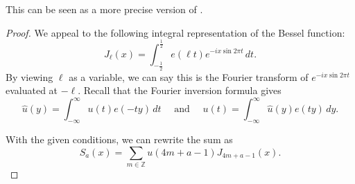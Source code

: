 \documentclass[reqno, 12pt]{amsart}
\renewcommand{\leq}{\leqslant}
\begin{document}
This can be seen as a more precise version of \cite[Corollary 8.2]{iwaniec_low_2000}.

\begin{proof}
We appeal to the following integral representation of the Bessel function: 
\begin{equation}
\label{eq:bessel-integral-repr}
J_\ell(x) = \int_{-\frac{1}{2}}^{\frac{1}{2}} e(\ell t) e^{-ix \sin 2\pi t} \,dt.
\end{equation}
By viewing $\ell$ as a variable, we can say this is the Fourier transform of $e^{-ix \sin 2\pi t}$ evaluated at $-\ell$. Recall that the Fourier inversion formula gives
\[ \hat{u}(y) = \int_{-\infty}^{\infty} u(t) e(-ty) \,dt \quad \text{ and } \quad u(t) = \int_{-\infty}^\infty \hat{u}(y) e(ty) \,dy. \]


{With the given conditions, we can rewrite the sum as
\[ S_a(x) = \sum_{m \in \mathbb{Z}} u(4m+a-1) J_{4m+a-1}(x). \]
}


\end{proof}
\end{document}
